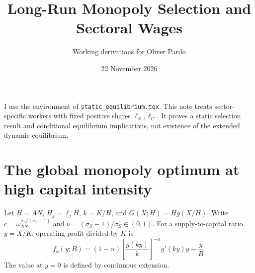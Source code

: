 \documentclass[11pt]{article}
\title{Long-Run Monopoly Selection and Sectoral Wages}
\author{Working derivations for Oliver Pardo}
\date{22 November 2026}
\begin{document}
\maketitle
I use the environment of \texttt{static\_equilibrium.tex}. This note treats
sector-specific workers with fixed positive shares $\ell_S,\ell_C$.
It proves a static selection result and conditional equilibrium implications,
not existence of the extended dynamic equilibrium.

\section{The global monopoly optimum at high capital intensity}
Let $H=AN$, $H_j=\ell_jH$, $k=K/H$, and $G(X;H)=H g(X/H)$.
Write $c=\omega_{XS}^{\sigma_S/(\sigma_S-1)}$ and
$\nu=(\sigma_S-1)/\sigma_S\in(0,1)$.
For a supply-to-capital ratio $y=X/K$, operating profit divided by $K$ is
\begin{equation}
 f_k(y;B)=(1-\alpha)
 \left[\frac{g(ky)}k\right]^{-\alpha}g'(ky)y-\frac yB.
 \label{eq:selection-objective}
\end{equation}
The value at $y=0$ is defined by continuous extension.
\end{document}
